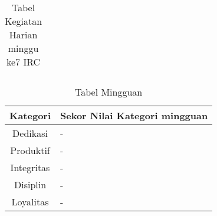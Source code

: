 \begin{table}[h]
\caption{Tabel Kegiatan Harian minggu ke7 IRC}
\centering
\begin{tabular}{|c|c|l|}
\hline
\hline
\end{tabular}
\label{table:contoh}
\end{table}

\begin{table}[h]
\begin{center}
\caption{Tabel Mingguan}
\begin{tabular}{|c|l|}
\hline
Kategori& Sekor Nilai Kategori mingguan\\
\hline
Dedikasi & -\\
\hline
Produktif & -\\
\hline
Integritas & -\\
\hline
Disiplin & -\\
\hline
Loyalitas & -\\
\hline
\end{tabular}
\end{center}
\label {Tabel:contoh} 
\end{table}